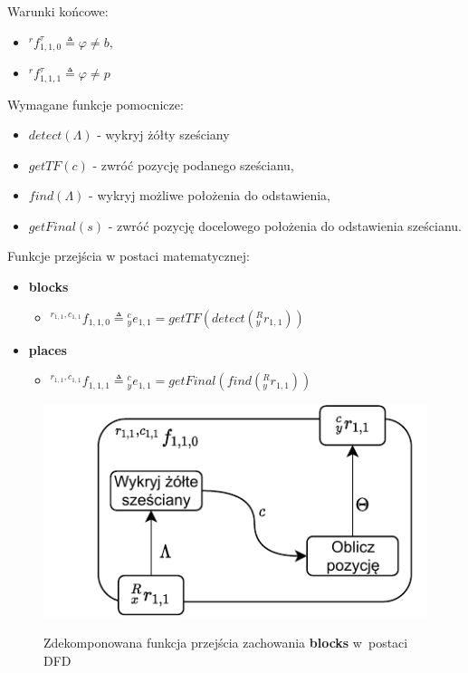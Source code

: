Warunki końcowe:
\begin{itemize}
    \item ${}^{r}f^{\tau}_{1,1,0} \triangleq \varphi \neq b$,
    \item ${}^{r}f^{\tau}_{1,1,1} \triangleq \varphi \neq p$
\end{itemize}

Wymagane funkcje pomocnicze:
\begin{itemize}
    \item $detect(\Lambda)$ - wykryj żółty sześciany
    \item $getTF(c)$ - zwróć pozycję podanego sześcianu,
    
    \item $find(\Lambda)$ - wykryj możliwe położenia do odstawienia,
    \item $getFinal(s)$ - zwróć pozycję docelowego położenia do odstawienia sześcianu.
\end{itemize}

Funkcje przejścia w postaci matematycznej:
\begin{itemize}
    \item \textbf{blocks} \begin{itemize}
        \item ${}^{r_{1,1}, c_{1,1}}f_{1,1,0} \triangleq {}^{c}_{y}e_{1,1} = getTF(detect({}^{R}_{y}r_{1,1}))$
    \end{itemize} 
    \item \textbf{places} \begin{itemize}
        \item ${}^{r_{1,1}, c_{1,1}}f_{1,1,1} \triangleq {}^{c}_{y}e_{1,1} = getFinal(find({}^{R}_{y}r_{1,1}))$
    \end{itemize}
\end{itemize}

\begin{figure}
    \centering
    \includegraphics[width=\columnwidth]{figures/ISR-vr-camera-fp-blocks.pdf}
    \label{fig:vr-camera-fp-blocks}
    \caption{Zdekomponowana funkcja przejścia zachowania \textbf{blocks} w~postaci DFD}
\end{figure}


